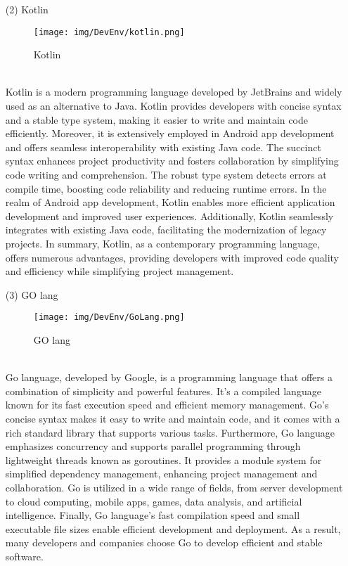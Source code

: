 \documentclass[conference]{IEEEtran}
\begin{document}
\begin{enumerate}
\begin{itemize}
\begin{itemize}
\item [(2)] Kotlin\cite{Kotlin}
\begin{figure}[h]
\centering
\texttt{[image: img/DevEnv/kotlin.png]}
\centering
\caption{Kotlin} 
\end{figure}\\
Kotlin is a modern programming language developed by JetBrains and widely used as an alternative to Java. Kotlin provides developers with concise syntax and a stable type system, making it easier to write and maintain code efficiently. Moreover, it is extensively employed in Android app development and offers seamless interoperability with existing Java code.
The succinct syntax enhances project productivity and fosters collaboration by simplifying code writing and comprehension. The robust type system detects errors at compile time, boosting code reliability and reducing runtime errors. In the realm of Android app development, Kotlin enables more efficient application development and improved user experiences. Additionally, Kotlin seamlessly integrates with existing Java code, facilitating the modernization of legacy projects.
In summary, Kotlin, as a contemporary programming language, offers numerous advantages, providing developers with improved code quality and efficiency while simplifying project management.\\

\item [(3)] GO lang\cite{GO lang}
\begin{figure}[h]
\centering
\texttt{[image: img/DevEnv/GoLang.png]}\centering
\caption{GO lang} 
\end{figure}\\
Go language, developed by Google, is a programming language that offers a combination of simplicity and powerful features. It's a compiled language known for its fast execution speed and efficient memory management. Go's concise syntax makes it easy to write and maintain code, and it comes with a rich standard library that supports various tasks.
Furthermore, Go language emphasizes concurrency and supports parallel programming through lightweight threads known as goroutines. It provides a module system for simplified dependency management, enhancing project management and collaboration. Go is utilized in a wide range of fields, from server development to cloud computing, mobile apps, games, data analysis, and artificial intelligence.
Finally, Go language's fast compilation speed and small executable file sizes enable efficient development and deployment. As a result, many developers and companies choose Go to develop efficient and stable software.\\


\end{itemize}
\end{itemize}
\end{enumerate}
\end{document}
